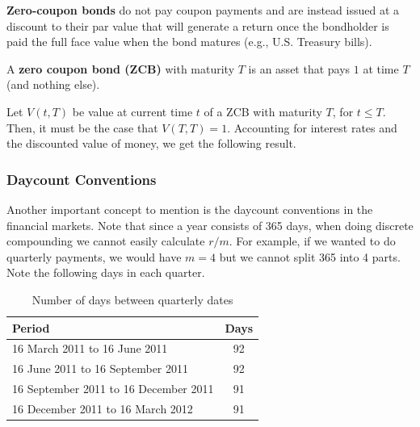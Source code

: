 \documentclass{article}
\begin{document}
    \begin{definition}
      \label{def:zero-coupon-bonds}
      \textbf{Zero-coupon bonds} do not pay coupon payments and are instead issued at a discount to their par value that will generate a return once the bondholder is paid the full face value when the bond matures (e.g., U.S. Treasury bills).
    \end{definition}

    \begin{definition}
      \label{def:zero-coupon-bond}
      A \textbf{zero coupon bond (ZCB)} with maturity $T$ is an asset that pays $1$ at time $T$ (and nothing else). 
    \end{definition}

    Let $V(t, T)$ be value at current time $t$ of a ZCB with maturity $T$, for $t \leq T$. Then, it must be the case that $V(T, T) = 1$. Accounting for interest rates and the discounted value of money, we get the following result. 

    \subsubsection{Daycount Conventions}

      Another important concept to mention is the daycount conventions in the financial markets. Note that since a year consists of 365 days, when doing discrete compounding we cannot easily calculate $r/m$. For example, if we wanted to do quarterly payments, we would have $m = 4$ but we cannot split 365 into 4 parts. Note the following days in each quarter. 

      \begin{table}[H]
        \centering
        \caption{Number of days between quarterly dates}
        \label{table:quarterly_days}
        \begin{tabular}{@{}lc@{}}
        \hline
        Period                               & Days \\ 
        \hline
        16 March 2011 to 16 June 2011        & 92   \\
        16 June 2011 to 16 September 2011    & 92   \\
        16 September 2011 to 16 December 2011& 91   \\
        16 December 2011 to 16 March 2012    & 91   \\ 
        \hline
        \end{tabular}
      \end{table}
      
\end{document}
